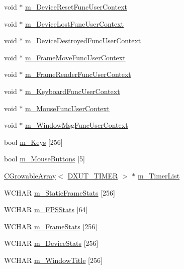 \begin{DoxyCompactItemize}
void $\ast$ \hyperlink{struct_d_x_u_t_state_1_1_s_t_a_t_e_a14668d92507cc7f4889ed13274614b5c}{m\_\-DeviceResetFuncUserContext}
\item 
void $\ast$ \hyperlink{struct_d_x_u_t_state_1_1_s_t_a_t_e_a80714e669cb2592973f94c91a212f982}{m\_\-DeviceLostFuncUserContext}
\item 
void $\ast$ \hyperlink{struct_d_x_u_t_state_1_1_s_t_a_t_e_ae00fca523371722f49601ca5a6af7cea}{m\_\-DeviceDestroyedFuncUserContext}
\item 
void $\ast$ \hyperlink{struct_d_x_u_t_state_1_1_s_t_a_t_e_a110968f3db2e93ceffdf75eb49ffa766}{m\_\-FrameMoveFuncUserContext}
\item 
void $\ast$ \hyperlink{struct_d_x_u_t_state_1_1_s_t_a_t_e_a682a510bf45e93b25adf55c8385f0d7d}{m\_\-FrameRenderFuncUserContext}
\item 
void $\ast$ \hyperlink{struct_d_x_u_t_state_1_1_s_t_a_t_e_aa4047cd7134c8af8e567720e521992c5}{m\_\-KeyboardFuncUserContext}
\item 
void $\ast$ \hyperlink{struct_d_x_u_t_state_1_1_s_t_a_t_e_aaccf619ab6ad3da01bdecc0fd6c51e79}{m\_\-MouseFuncUserContext}
\item 
void $\ast$ \hyperlink{struct_d_x_u_t_state_1_1_s_t_a_t_e_ae847d206ac01990e7240ca915817a41f}{m\_\-WindowMsgFuncUserContext}
\item 
bool \hyperlink{struct_d_x_u_t_state_1_1_s_t_a_t_e_a55465563b5a34df8c923c1ed0c169c9a}{m\_\-Keys} \mbox{[}256\mbox{]}
\item 
bool \hyperlink{struct_d_x_u_t_state_1_1_s_t_a_t_e_a6e494c7c6eb55ee3ad56a53325b679d4}{m\_\-MouseButtons} \mbox{[}5\mbox{]}
\item 
\hyperlink{class_c_growable_array}{CGrowableArray}$<$ \hyperlink{struct_d_x_u_t___t_i_m_e_r}{DXUT\_\-TIMER} $>$ $\ast$ \hyperlink{struct_d_x_u_t_state_1_1_s_t_a_t_e_a044d4d33534c19e0fdb1d4f69185679f}{m\_\-TimerList}
\item 
WCHAR \hyperlink{struct_d_x_u_t_state_1_1_s_t_a_t_e_aa4b70ae5dbeca009b9a185e49ba9bdee}{m\_\-StaticFrameStats} \mbox{[}256\mbox{]}
\item 
WCHAR \hyperlink{struct_d_x_u_t_state_1_1_s_t_a_t_e_aa5ccc0bb5101ad554646aeacd2293c49}{m\_\-FPSStats} \mbox{[}64\mbox{]}
\item 
WCHAR \hyperlink{struct_d_x_u_t_state_1_1_s_t_a_t_e_ab5b65a32e46b0731bac65d4e891aa43d}{m\_\-FrameStats} \mbox{[}256\mbox{]}
\item 
WCHAR \hyperlink{struct_d_x_u_t_state_1_1_s_t_a_t_e_a54620fb74287643a6fcf5a63cad07a8c}{m\_\-DeviceStats} \mbox{[}256\mbox{]}
\item 
WCHAR \hyperlink{struct_d_x_u_t_state_1_1_s_t_a_t_e_ad8779ed13105638022a10ba2e9810da9}{m\_\-WindowTitle} \mbox{[}256\mbox{]}
\end{DoxyCompactItemize}


